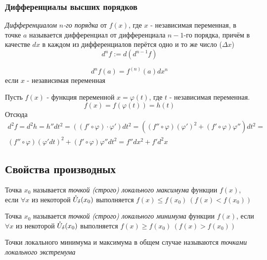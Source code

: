 \subsubsection*{Дифференциалы высших порядков}

\begin{definition}
	\textit{Дифференциалом $n$-го порядка} от $f(x)$, где $x$ - независимая переменная, в точке $a$ называется дифференциал от дифференциала $n - 1$-го порядка, причём в качестве $dx$ в каждом из дифференциалов перётся одно и то же число ($\Delta x$)
	\[
		d^{n}f := d(d^{n - 1}f)
	\]
\end{definition}

\begin{corollary}
	\[
		d^nf(a) = f^{(n)}(a) dx^n
	\]
	если $x$ - независимая переменная
\end{corollary}

\begin{example}
	Пусть $f(x)$ - функция переменной $x = \varphi(t)$, где $t$ - независимая переменная.
	\[
		f(x) = f(\varphi(t)) = h(t)
	\]
	Отсюда
	\begin{multline*}
		d^2f = d^2h = h'' dt^2 = \left((f' \circ \varphi) \cdot \varphi'\right)dt^2 = \left((f'' \circ \varphi)(\varphi')^2 + (f' \circ \varphi)\varphi''\right)dt^2 = \\
		(f'' \circ \varphi)(\varphi'dt)^2 + (f' \circ \varphi)\varphi'' dt^2 = f''dx^2 + f'd^2x
	\end{multline*}
\end{example}

\subsection{Свойства производных}

\begin{definition}
	Точка $x_0$ называется \textit{точкой (строго) локального максимума} функции $f(x)$, если $\forall x$ из некоторой $\mathring{U}_{\delta}(x_0)$ выполняется $f(x) \le f(x_0)\ (f(x) < f(x_0))$
\end{definition}

\begin{definition}
	Точка $x_0$ называется \textit{точкой (строго) локального минимума} функции $f(x)$, если $\forall x$ из некоторой $\mathring{U}_{\delta}(x_0)$ выполняется $f(x) \ge f(x_0)\ (f(x) > f(x_0))$
\end{definition}

\begin{definition}
	Точки локального минимума и максимума в общем случае называются \textit{точками локального экстремума}
\end{definition}

